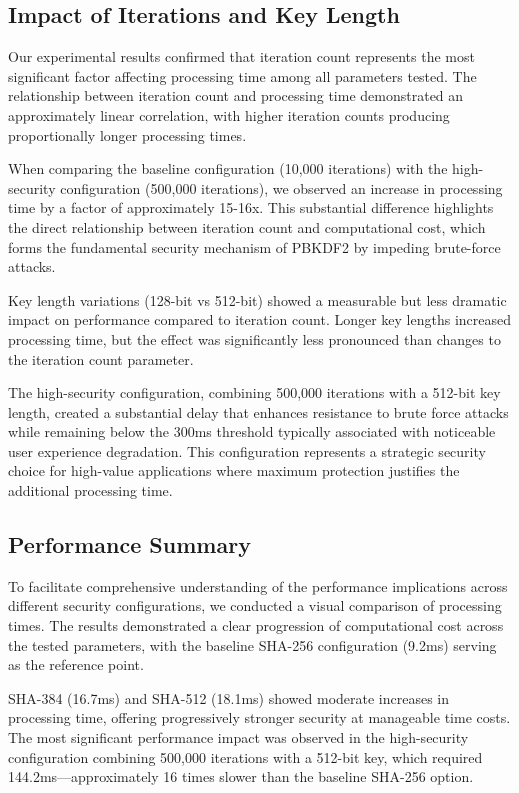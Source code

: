 \documentclass[11pt,a4paper]{article}
\begin{document}
\subsection{Impact of Iterations and Key Length}
Our experimental results confirmed that iteration count represents the most significant factor affecting processing time among all parameters tested. The relationship between iteration count and processing time demonstrated an approximately linear correlation, with higher iteration counts producing proportionally longer processing times.

When comparing the baseline configuration (10,000 iterations) with the high-security configuration (500,000 iterations), we observed an increase in processing time by a factor of approximately 15-16x. This substantial difference highlights the direct relationship between iteration count and computational cost, which forms the fundamental security mechanism of PBKDF2 by impeding brute-force attacks.

Key length variations (128-bit vs 512-bit) showed a measurable but less dramatic impact on performance compared to iteration count. Longer key lengths increased processing time, but the effect was significantly less pronounced than changes to the iteration count parameter.

The high-security configuration, combining 500,000 iterations with a 512-bit key length, created a substantial delay that enhances resistance to brute force attacks while remaining below the 300ms threshold typically associated with noticeable user experience degradation. This configuration represents a strategic security choice for high-value applications where maximum protection justifies the additional processing time.
\subsection{Performance Summary}
To facilitate comprehensive understanding of the performance implications across different security configurations, we conducted a visual comparison of processing times. The results demonstrated a clear progression of computational cost across the tested parameters, with the baseline SHA-256 configuration (9.2ms) serving as the reference point.

SHA-384 (16.7ms) and SHA-512 (18.1ms) showed moderate increases in processing time, offering progressively stronger security at manageable time costs. The most significant performance impact was observed in the high-security configuration combining 500,000 iterations with a 512-bit key, which required 144.2ms—approximately 16 times slower than the baseline SHA-256 option.
\end{document}
